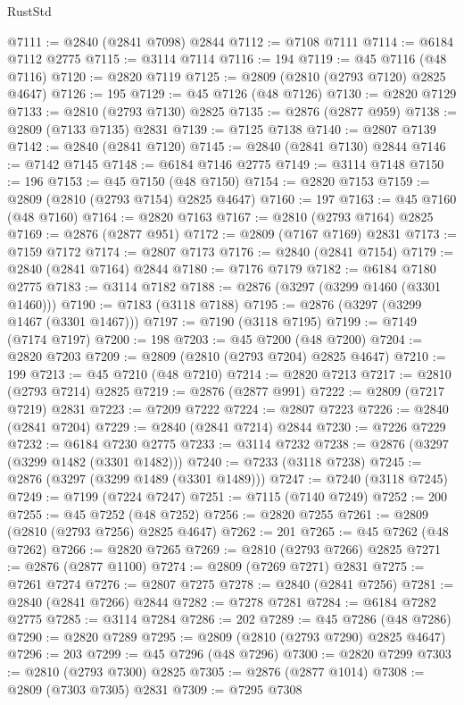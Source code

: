 \begin{lexlean}{RustStd}
\begin{coremodule}
@7111 := @2840 (@2841 @7098) @2844
@7112 := @7108 @7111
@7114 := @6184 @7112 @2775
@7115 := @3114 @7114
@7116 := 194
@7119 := @45 @7116 (@48 @7116)
@7120 := @2820 @7119
@7125 := @2809 (@2810 (@2793 @7120) @2825 @4647)
@7126 := 195
@7129 := @45 @7126 (@48 @7126)
@7130 := @2820 @7129
@7133 := @2810 (@2793 @7130) @2825
@7135 := @2876 (@2877 @959)
@7138 := @2809 (@7133 @7135) @2831
@7139 := @7125 @7138
@7140 := @2807 @7139
@7142 := @2840 (@2841 @7120)
@7145 := @2840 (@2841 @7130) @2844
@7146 := @7142 @7145
@7148 := @6184 @7146 @2775
@7149 := @3114 @7148
@7150 := 196
@7153 := @45 @7150 (@48 @7150)
@7154 := @2820 @7153
@7159 := @2809 (@2810 (@2793 @7154) @2825 @4647)
@7160 := 197
@7163 := @45 @7160 (@48 @7160)
@7164 := @2820 @7163
@7167 := @2810 (@2793 @7164) @2825
@7169 := @2876 (@2877 @951)
@7172 := @2809 (@7167 @7169) @2831
@7173 := @7159 @7172
@7174 := @2807 @7173
@7176 := @2840 (@2841 @7154)
@7179 := @2840 (@2841 @7164) @2844
@7180 := @7176 @7179
@7182 := @6184 @7180 @2775
@7183 := @3114 @7182
@7188 := @2876 (@3297 (@3299 @1460 (@3301 @1460)))
@7190 := @7183 (@3118 @7188)
@7195 := @2876 (@3297 (@3299 @1467 (@3301 @1467)))
@7197 := @7190 (@3118 @7195)
@7199 := @7149 (@7174 @7197)
@7200 := 198
@7203 := @45 @7200 (@48 @7200)
@7204 := @2820 @7203
@7209 := @2809 (@2810 (@2793 @7204) @2825 @4647)
@7210 := 199
@7213 := @45 @7210 (@48 @7210)
@7214 := @2820 @7213
@7217 := @2810 (@2793 @7214) @2825
@7219 := @2876 (@2877 @991)
@7222 := @2809 (@7217 @7219) @2831
@7223 := @7209 @7222
@7224 := @2807 @7223
@7226 := @2840 (@2841 @7204)
@7229 := @2840 (@2841 @7214) @2844
@7230 := @7226 @7229
@7232 := @6184 @7230 @2775
@7233 := @3114 @7232
@7238 := @2876 (@3297 (@3299 @1482 (@3301 @1482)))
@7240 := @7233 (@3118 @7238)
@7245 := @2876 (@3297 (@3299 @1489 (@3301 @1489)))
@7247 := @7240 (@3118 @7245)
@7249 := @7199 (@7224 @7247)
@7251 := @7115 (@7140 @7249)
@7252 := 200
@7255 := @45 @7252 (@48 @7252)
@7256 := @2820 @7255
@7261 := @2809 (@2810 (@2793 @7256) @2825 @4647)
@7262 := 201
@7265 := @45 @7262 (@48 @7262)
@7266 := @2820 @7265
@7269 := @2810 (@2793 @7266) @2825
@7271 := @2876 (@2877 @1100)
@7274 := @2809 (@7269 @7271) @2831
@7275 := @7261 @7274
@7276 := @2807 @7275
@7278 := @2840 (@2841 @7256)
@7281 := @2840 (@2841 @7266) @2844
@7282 := @7278 @7281
@7284 := @6184 @7282 @2775
@7285 := @3114 @7284
@7286 := 202
@7289 := @45 @7286 (@48 @7286)
@7290 := @2820 @7289
@7295 := @2809 (@2810 (@2793 @7290) @2825 @4647)
@7296 := 203
@7299 := @45 @7296 (@48 @7296)
@7300 := @2820 @7299
@7303 := @2810 (@2793 @7300) @2825
@7305 := @2876 (@2877 @1014)
@7308 := @2809 (@7303 @7305) @2831
@7309 := @7295 @7308

\end{coremodule}
\end{lexlean}
